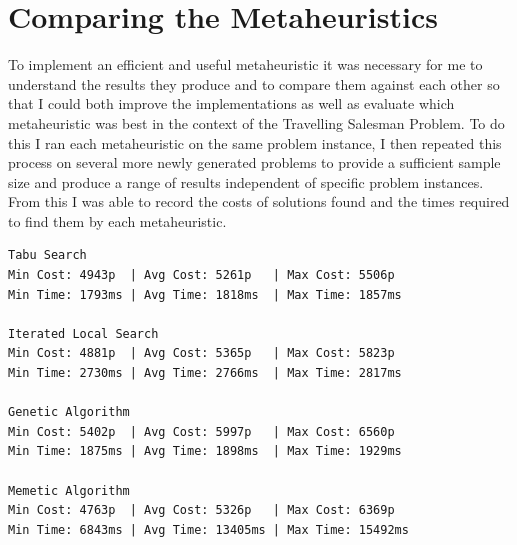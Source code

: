 \documentclass[]{final_report}
\begin{document}
\section*{Comparing the Metaheuristics}

To implement an efficient and useful metaheuristic it was necessary for me to understand the results they produce and to compare them against each other so that I could both improve the implementations as well as evaluate which metaheuristic was best in the context of the Travelling Salesman Problem. To do this I ran each metaheuristic on the same problem instance, I then repeated this process on several more newly generated problems to provide a sufficient sample size and produce a range of results independent of specific problem instances. From this I was able to record the costs of solutions found and the times required to find them by each metaheuristic.

\begin{verbatim}
Tabu Search
Min Cost: 4943p  | Avg Cost: 5261p   | Max Cost: 5506p
Min Time: 1793ms | Avg Time: 1818ms  | Max Time: 1857ms

Iterated Local Search
Min Cost: 4881p  | Avg Cost: 5365p   | Max Cost: 5823p
Min Time: 2730ms | Avg Time: 2766ms  | Max Time: 2817ms

Genetic Algorithm
Min Cost: 5402p  | Avg Cost: 5997p   | Max Cost: 6560p
Min Time: 1875ms | Avg Time: 1898ms  | Max Time: 1929ms

Memetic Algorithm
Min Cost: 4763p  | Avg Cost: 5326p   | Max Cost: 6369p
Min Time: 6843ms | Avg Time: 13405ms | Max Time: 15492ms
\end{verbatim}
\end{document}
